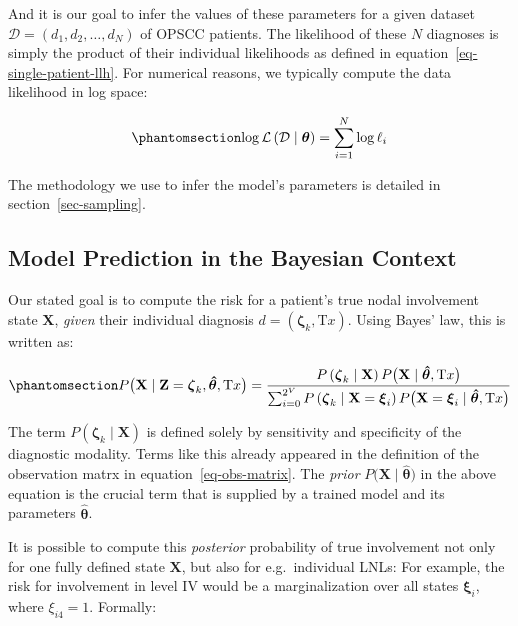 \documentclass[
  sn-mathphys-num,
]{sn-jnl}
\begin{document}
And it is our goal to infer the values of these parameters for a given
dataset \(\mathcal{D} = \left( d_1, d_2, \ldots, d_N \right)\) of OPSCC
patients. The likelihood of these \(N\) diagnoses is simply the product
of their individual likelihoods as defined in
equation~\ref{eq-single-patient-llh}. For numerical reasons, we
typically compute the data likelihood in log space:

\begin{equation}\phantomsection\label{eq-log-likelihood}{
\log \mathcal{L} \left( \mathcal{D} \mid \boldsymbol{\theta} \right) = \sum_{i=1}^N \log \ell_i
}\end{equation}

The methodology we use to infer the model's parameters is detailed in
section~\ref{sec-sampling}.

\subsection{Model Prediction in the Bayesian
Context}\label{model-prediction-in-the-bayesian-context}

Our stated goal is to compute the risk for a patient's true nodal
involvement state \(\mathbf{X}\), \emph{given} their individual
diagnosis \(d = \left( \boldsymbol{\zeta}_k, \text{T}x \right)\). Using
Bayes' law, this is written as:

\begin{equation}\phantomsection\label{eq-uni-bayes-law}{
P \big( \mathbf{X} \mid \mathbf{Z}=\boldsymbol{\zeta}_k, \boldsymbol{\hat{\theta}}, \text{T}x \big) = \frac{P \left( \boldsymbol{\zeta}_k \mid \mathbf{X} \right) P \big( \mathbf{X} \mid \boldsymbol{\hat{\theta}}, \text{T}x \big)}{\sum_{i=0}^{2^V} P \left( \boldsymbol{\zeta}_k \mid \mathbf{X}=\boldsymbol{\xi}_i \right) P \big( \mathbf{X}=\boldsymbol{\xi}_i \mid \boldsymbol{\hat{\theta}}, \text{T}x \big)}
}\end{equation}

The term \(P \left( \boldsymbol{\zeta}_k \mid \mathbf{X} \right)\) is
defined solely by sensitivity and specificity of the diagnostic
modality. Terms like this already appeared in the definition of the
observation matrx in equation~\ref{eq-obs-matrix}. The \emph{prior}
\(P \big( \mathbf{X} \mid \boldsymbol{\hat{\theta}} \big)\) in the above
equation is the crucial term that is supplied by a trained model and its
parameters \(\boldsymbol{\hat{\theta}}\).

It is possible to compute this \emph{posterior} probability of true
involvement not only for one fully defined state \(\mathbf{X}\), but
also for e.g.~individual LNLs: For example, the risk for involvement in
level IV would be a marginalization over all states
\(\boldsymbol{\xi}_i\), where \(\xi_{i4}=1\). Formally:
\end{document}
